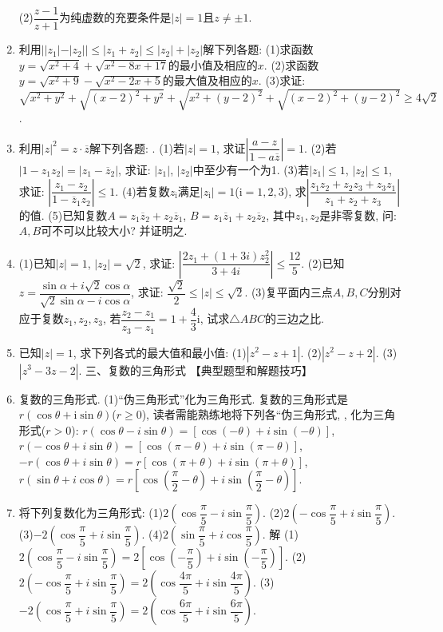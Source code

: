 \documentclass[10pt,a4paper]{article}
\begin{document}
\begin{enumerate}[1.]
(2)$\dfrac{z-1}{z+1}$为纯虚数的充要条件是$|z|=1$且$z\ne \pm 1$.
\item 利用$||z_1|-|z_2||\le|z_1+z_2|\le|z_2|+|z_2|$解下列各题:
(1)求函数$y=\sqrt {x^2+4}+\sqrt {x^2-8x+17}$的最小值及相应的$x$.
(2)求函数$y=\sqrt {x^2+9}-\sqrt {x^2-2x+5}$的最大值及相应的$x$.
(3)求证: $\sqrt {x^2+y^2}+\sqrt {(x-2)^2+y^2}+\sqrt {x^2+(y-2)^2}+\sqrt {(x-2)^2+(y-2)^2}\ge 4\sqrt 2$.
\item 利用$|z|^2=z\cdot \overline z$解下列各题: .
(1)若$|z|=1$, 求证$|\dfrac{a-z}{1-a\overline z}|=1$.
(2)若$|1-z_1z_2|=|z_1-\overline z_2|$, 求证: $|z_1|$, $|z_2|$中至少有一个为1.
(3)若$|z_1|\le 1$, $|z_2|\le 1$, 求证: $|\dfrac{{z_1}-{z_2}}{1-{{\overline z}_1}{z_2}}|\le 1$.
(4)若复数$z_{\mathrm{i}}$满足$|z_{\mathrm{i}}|=1$($\mathrm{i}=1,2,3$), 求$|\dfrac{{z_1}{z_2}+{z_2}{z_3}+{z_3}{z_1}}{{z_1}+{z_2}+{z_3}}|$的值.
(5)已知复数$A=z_1\overline z_2+z_2\overline z_1$, $B=z_1\overline z_1+z_2\overline z_2$, 其中$z_1,z_2$是非零复数, 问: $A,B$可不可以比较大小? 并证明之.
\item (1)已知$|z|=1$, $|z_2|=\sqrt 2$, 求证: $|\dfrac{2{z_1}+(1+3i)z_2^2}{3+4i}|\le \dfrac{12}5$.
(2)已知$z=\dfrac{\sin \alpha +i\sqrt 2\cos \alpha }{\sqrt 2\sin \alpha -i\cos \alpha }$, 求证: $\dfrac{\sqrt 2}2\le|z|\le \sqrt 2$.
(3)复平面内三点$A,B,C$分别对应于复数$z_1,z_2,z_3$, 若$\dfrac{{z_2}-{z_1}}{{z_3}-{z_1}}=1+\dfrac 43\mathrm{i}$, 试求$\triangle ABC$的三边之比.
\item 已知$|z|=1$, 求下列各式的最大值和最小值:
(1)$|z^2-z+1|$.		(2)$|z^2-z+2|$.		(3)$|z^3-3z-2|$.
三、复数的三角形式
【典型题型和解题技巧】
\item 复数的三角形式.
(1)``伪三角形式''化为三角形式.
复数的三角形式是$r(\cos \theta +\mathrm{i}\sin \theta)$($r\ge 0$), 读者需能熟练地将下列各``伪三角形式, , 化为三角形式($r>0$):
$r(\cos \theta -i\sin \theta)=[\cos (-\theta)+i\sin (-\theta)]$, $r(-\cos \theta +i\sin \theta)=[\cos (\pi -\theta)+i\sin (\pi -\theta)]$, $-r(\cos \theta +i\sin \theta)=r[\cos (\pi +\theta)+i\sin (\pi +\theta)]$,
$r(\sin \theta +i\cos \theta)=r[\cos (\dfrac{\pi }2-\theta)+i\sin (\dfrac{\pi }2-\theta)]$.
\item 将下列复数化为三角形式:
(1)$2(\cos \dfrac{\pi }5-i\sin \dfrac{\pi }5)$.					(2)$2(-\cos \dfrac{\pi }5+i\sin \dfrac{\pi }5)$.
(3)$-2(\cos \dfrac{\pi }5+i\sin \dfrac{\pi }5)$.					(4)$2(\sin \dfrac{\pi }5+i\cos \dfrac{\pi }5)$.
解  (1)$2(\cos \dfrac{\pi }5-i\sin \dfrac{\pi }5)=2[\cos (-\dfrac{\pi }5)+i\sin (-\dfrac{\pi }5)]$.
(2)$2(-\cos \dfrac{\pi }5+i\sin \dfrac{\pi }5)=2(\cos \dfrac{4\pi }5+i\sin \dfrac{4\pi }5)$.
(3)$-2(\cos \dfrac{\pi }5+i\sin \dfrac{\pi }5)=2(\cos \dfrac{6\pi }5+i\sin \dfrac{6\pi }5)$.

\end{enumerate}
\end{document}
